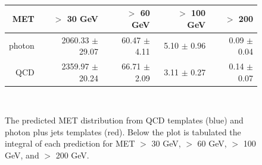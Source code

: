 \begin{figure}[hbt]
  \begin{center}
	\\ \medskip
    \begin{tabular}{r|r|r|r|r}
      MET    & $>$ 30 GeV       & $>$ 60 GeV        & $>$ 100 GeV       & $>$ 200  \\ \hline

photon &  2060.33  $\pm$  29.07  &   60.47  $\pm$  4.11  &    5.10  $\pm$  0.96  &    0.09  $\pm$  0.04 \\
   QCD & 2359.97 $\pm$  20.24 &  66.71 $\pm$   2.09 &   3.11 $\pm$   0.27 &   0.14 $\pm$   0.07 \\


    \end{tabular}
	\\ \medskip
    \caption{The predicted MET distribution from QCD templates (blue) and photon plus jets
	  templates (red). %
	  Below the plot is tabulated the integral of each prediction for
	  MET $>$ 30 GeV, $>$ 60 GeV, $>$ 100 GeV, and $>$ 200 GeV. 
	}
    \label{fig:comptemp}
  \end{center}
\end{figure}
